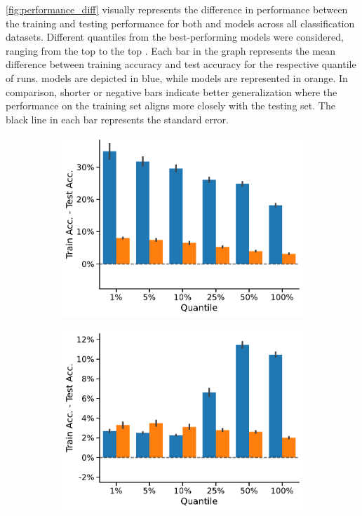 \cref{fig:performance_diff} visually represents the difference in performance between the training and testing performance for both \wlnn and \gnn models across all classification datasets. Different quantiles from the best-performing models were considered, ranging from the top  to the top . Each bar in the graph represents the mean difference between training accuracy and test accuracy for the respective quantile of runs. \wlnn models are depicted in blue, while \gnn models are represented in orange. In comparison, shorter or negative bars indicate better generalization where the performance on the training set aligns more closely with the testing set. The black line in each bar represents the standard error.

\begin{figure}[!b]
	\begin{subfigure}[b]{0.3\textwidth}
		\centering
		\includegraphics[width=\textwidth]{Figures/train_test_diff_ENZYMES.pdf}
		\vspace*{-4ex} 
		\caption{\enzymes}
	\end{subfigure}
	\hfill
	\begin{subfigure}[b]{0.3\textwidth}
		\centering
		\includegraphics[width=\textwidth]{Figures/train_test_diff_IMDB-BINARY.pdf}

\end{subfigure}
\end{figure}
